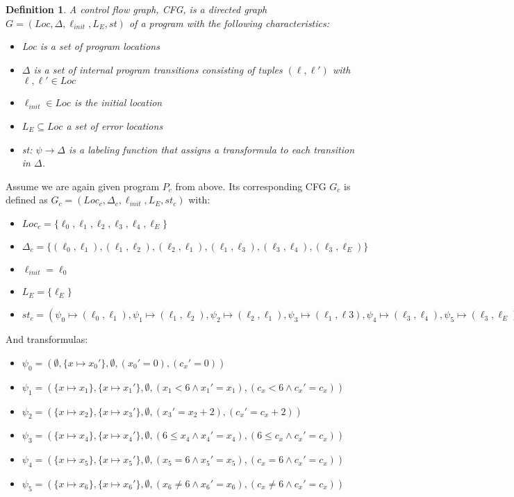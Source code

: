 \documentclass{article}
\newtheorem{mydef}{Definition}
\begin{document}
\begin{mydef}
	A control flow graph, CFG, is a directed graph $G = (Loc, \Delta, \ell_{init}, L_E, st)$ of a program with the following characteristics:
	\begin{itemize}
		\item  Loc is a set of program locations
		\item $\Delta$ is a set of internal program transitions consisting of tuples $(\ell, \ell')$ with $\ell, \ell' \in Loc$
		\item $\ell_{init} \in Loc$ is the initial location
		\item $L_E \subseteq Loc$ a set of error locations
		\item st: $\psi \rightarrow \Delta $ is a labeling function that assigns a transformula to each transition in $\Delta$.
	\end{itemize}
\end{mydef} \noindent
%

Assume we are again given program $P_c$ from above. Its corresponding CFG $G_c$ is defined as $G_c = (Loc_c, \Delta_c, \ell_{init}, L_E, st_c)$ with: 
\begin{itemize}
	\item $Loc_c = \{\ell_0, \ell_1, \ell_2, \ell_3, \ell_4, \ell_E\}$
	\item $\Delta_c =\{(\ell_0, \ell_1), (\ell_1, \ell_2), (\ell_2, \ell_1), (\ell_1, \ell_3), (\ell_3, \ell_4), (\ell_3, \ell_E)\} $
	\item $\ell_{init} = \ell_{0}$
	\item $L_E = \{\ell_E\}$
	\item $st_c = ( \psi_0 \mapsto (\ell_0, \ell_1) , \psi_1 \mapsto (\ell_1, \ell_2), \psi_2 \mapsto (\ell_2, \ell_1), \psi_3 \mapsto (\ell_1, \ell3), \psi_4 \mapsto (\ell_3, \ell_4), \psi_5 \mapsto (\ell_3, \ell_E))$ 
\end{itemize}
And transformulas: 
\begin{itemize}
	\item $\psi_0 = (\emptyset, \{x \mapsto x_0'\}, \emptyset, (x_0' = 0), (c_x' = 0))$
	\item $\psi_1 = ( \{x \mapsto x_1\}, \{x \mapsto x_1'\}, \emptyset, (x_1 < 6 \land x_1' = x_1), (c_x < 6 \land c_x' = c_x))$
	\item $\psi_2 = (\{ x \mapsto x_2\}, \{ x \mapsto x_3' \}, \emptyset, (x_3' = x_2 + 2), (c_x' = c_x + 2))$
	\item $\psi_3 = (\{x \mapsto x_4\}, \{x \mapsto x_4'\}, \emptyset, (6 \leq x_4 \land x_4' = x_4), (6 \leq c_x \land c_x' = c_x))$
	\item $\psi_4 = (\{x \mapsto x_5\}, \{x \mapsto x_5'\}, \emptyset, (x_5 = 6 \land x_5' = x_5), (c_x = 6 \land c_x' = c_x))$
	\item $\psi_5 = (\{x \mapsto x_6\}, \{x \mapsto x_6'\}, \emptyset, (x_6 \neq 6 
	\land x_6' = x_6), (c_x \neq 6 \land c_x' = c_x))$
\end{itemize}
\end{document}
